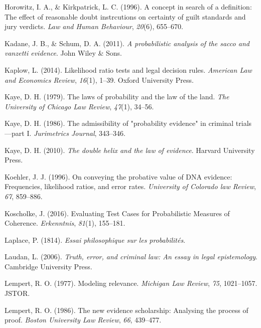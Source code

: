 \documentclass[11pt,dvipsnames,enabledeprecatedfontcommands]{scrartcl}
\begin{document}
\leavevmode\hypertarget{ref-Horowitz1996}{}%
Horowitz, I. A., \& Kirkpatrick, L. C. (1996). A concept in search of a
definition: The effect of reasonable doubt instrcutions on certainty of
guilt standards and jury verdicts. \emph{Law and Human Behaviour},
\emph{20}(6), 655--670.

\leavevmode\hypertarget{ref-kadane2011probabilistic}{}%
Kadane, J. B., \& Schum, D. A. (2011). \emph{A probabilistic analysis of
the sacco and vanzetti evidence}. John Wiley \& Sons.

\leavevmode\hypertarget{ref-kaplow2014likelihood}{}%
Kaplow, L. (2014). Likelihood ratio tests and legal decision rules.
\emph{American Law and Economics Review}, \emph{16}(1), 1--39. Oxford
University Press.

\leavevmode\hypertarget{ref-kaye79}{}%
Kaye, D. H. (1979). The laws of probability and the law of the land.
\emph{The University of Chicago Law Review}, \emph{47}(1), 34--56.

\leavevmode\hypertarget{ref-kaye1986admissibility}{}%
Kaye, D. H. (1986). The admissibility of "probability evidence" in
criminal trials---part I. \emph{Jurimetrics Journal}, 343--346.

\leavevmode\hypertarget{ref-Kaye2010The-Double-Heli}{}%
Kaye, D. H. (2010). \emph{The double helix and the law of evidence}.
Harvard University Press.

\leavevmode\hypertarget{ref-Koehler1996On-Conveying-th}{}%
Koehler, J. J. (1996). On conveying the probative value of DNA evidence:
Frequencies, likelihood ratios, and error rates. \emph{University of
Colorado law Review}, \emph{67}, 859--886.

\leavevmode\hypertarget{ref-koscholke2016evaluating}{}%
Koscholke, J. (2016). Evaluating Test Cases for Probabilistic Measures
of Coherence. \emph{Erkenntnis}, \emph{81}(1), 155--181.

\leavevmode\hypertarget{ref-Laplace1814}{}%
Laplace, P. (1814). \emph{Essai philosophique sur les probabilités}.

\leavevmode\hypertarget{ref-laudan2006truth}{}%
Laudan, L. (2006). \emph{Truth, error, and criminal law: An essay in
legal epistemology}. Cambridge University Press.

\leavevmode\hypertarget{ref-lempert1977modeling}{}%
Lempert, R. O. (1977). Modeling relevance. \emph{Michigan Law Review},
\emph{75}, 1021--1057. JSTOR.

\leavevmode\hypertarget{ref-Lempert1986}{}%
Lempert, R. O. (1986). The new evidence scholarship: Analysing the
process of proof. \emph{Boston University Law Review}, \emph{66},
439--477.
\end{document}
